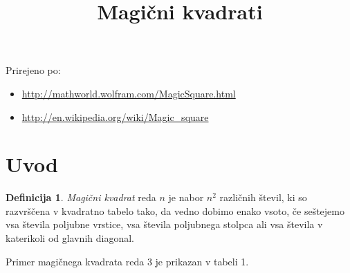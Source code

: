 \documentclass[a4paper,12pt]{article}
\title{Magični kvadrati}
\date{}
\author{}
\theoremstyle{definition}
\newtheorem{definicija}{Definicija}
\theoremstyle{plain}
\begin{document}
\maketitle

Prirejeno po:

\begin{itemize}
   \item \url{http://mathworld.wolfram.com/MagicSquare.html}%
   \item \url{http://en.wikipedia.org/wiki/Magic_square}%
\end{itemize}

\tableofcontents


\newpage

\section{Uvod}

   
   \begin{definicija}
      \emph{Magični kvadrat} reda \(n\) je nabor \(n^2\) različnih števil,
      ki so razvrščena v kvadratno tabelo tako, da vedno dobimo enako vsoto,
      če seštejemo vsa števila poljubne vrstice, vsa števila poljubnega
      stolpca ali vsa števila v katerikoli od glavnih diagonal.
   \end{definicija}

Primer magičnega kvadrata reda 3 je prikazan v tabeli 1. %
\end{document}
